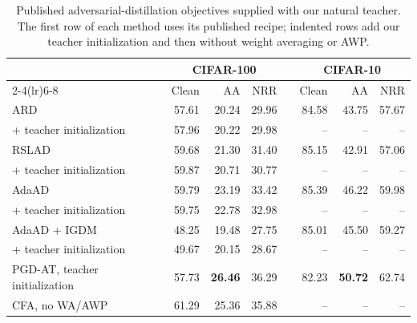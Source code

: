 \begin{table}[!htbp]
  \centering \small \setlength{\tabcolsep}{4pt}
  \caption{Published adversarial-distillation objectives supplied with our natural teacher. The first
  row of each method uses its published recipe; indented rows add our teacher initialization and then
  without weight averaging or AWP.}
  \label{tab:natteacher}
  \begin{tabular}{lrrrcrrr}
    \toprule
    & \multicolumn{3}{c}{CIFAR-100} && \multicolumn{3}{c}{CIFAR-10} \\
    \cmidrule(lr){2-4}\cmidrule(lr){6-8}
    & Clean & AA & NRR && Clean & AA & NRR \\
    \midrule
    ARD & 57.61 & 20.24 & 29.96 && 84.58 & 43.75 & 57.67 \\
    \quad + teacher initialization & 57.96 & 20.22 & 29.98 && -- & -- & -- \\
    RSLAD & 59.68 & 21.30 & 31.40 && 85.15 & 42.91 & 57.06 \\
    \quad + teacher initialization & 59.87 & 20.71 & 30.77 && -- & -- & -- \\
    AdaAD & 59.79 & 23.19 & 33.42 && 85.39 & 46.22 & 59.98 \\
    \quad + teacher initialization & 59.75 & 22.78 & 32.98 && -- & -- & -- \\
    AdaAD + IGDM & 48.25 & 19.48 & 27.75 && 85.01 & 45.50 & 59.27 \\
    \quad + teacher initialization & 49.67 & 20.15 & 28.67 && -- & -- & -- \\
    \midrule
    PGD-AT, teacher initialization & 57.73 & \textbf{26.46} & 36.29 && 82.23 & \textbf{50.72} & 62.74 \\
    CFA, no WA/AWP & 61.29 & 25.36 & 35.88 && -- & -- & -- \\
    \bottomrule
  \end{tabular}
\end{table}



